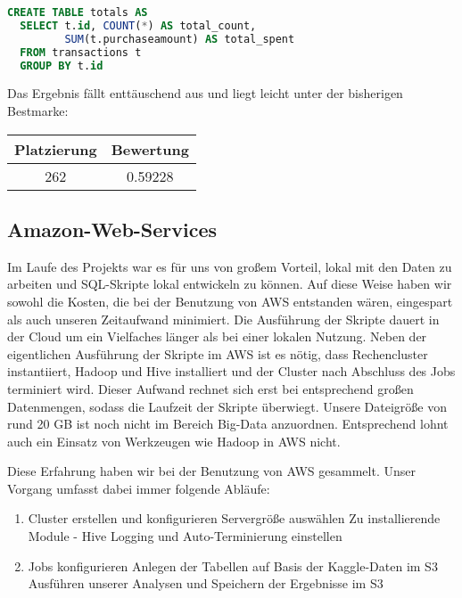 \begin{lstlisting}[language=SQL]
CREATE TABLE totals AS
  SELECT t.id, COUNT(*) AS total_count, 
         SUM(t.purchaseamount) AS total_spent
  FROM transactions t
  GROUP BY t.id
\end{lstlisting}

Das Ergebnis fällt enttäuschend aus und liegt leicht unter der bisherigen Bestmarke:

\begin{tabular}{|c|c|}
	\hline \textbf{Platzierung} & \textbf{Bewertung} \\ 
	\hline 262 & 0.59228  \\ 
	\hline 
\end{tabular}

\subsection{Amazon-Web-Services}
Im Laufe des Projekts war es für uns von großem Vorteil, lokal mit den Daten zu arbeiten und SQL-Skripte lokal entwickeln zu können. Auf diese Weise haben wir sowohl die Kosten, die bei der Benutzung von AWS entstanden wären, eingespart als auch unseren Zeitaufwand minimiert. Die Ausführung der Skripte dauert in der Cloud um ein Vielfaches länger als bei einer lokalen Nutzung. Neben der eigentlichen Ausführung der Skripte im AWS ist es nötig, dass Rechencluster instantiiert, Hadoop und Hive installiert und der Cluster nach Abschluss des Jobs terminiert wird. Dieser Aufwand rechnet sich erst bei entsprechend großen Datenmengen, sodass die Laufzeit der Skripte überwiegt. Unsere Dateigröße von rund 20 GB ist noch nicht im Bereich Big-Data anzuordnen. Entsprechend lohnt auch ein Einsatz von Werkzeugen wie Hadoop in AWS nicht.

Diese Erfahrung haben wir bei der Benutzung von AWS gesammelt. Unser Vorgang umfasst dabei immer folgende Abläufe:
\begin{enumerate}
\item Cluster erstellen und konfigurieren
\subitem Servergröße auswählen
\subitem Zu installierende Module - Hive
\subitem Logging und Auto-Terminierung einstellen
\item Jobs konfigurieren
\subitem Anlegen der Tabellen auf Basis der Kaggle-Daten im S3
\subitem Ausführen unserer Analysen und Speichern der Ergebnisse im S3
\end{enumerate}


